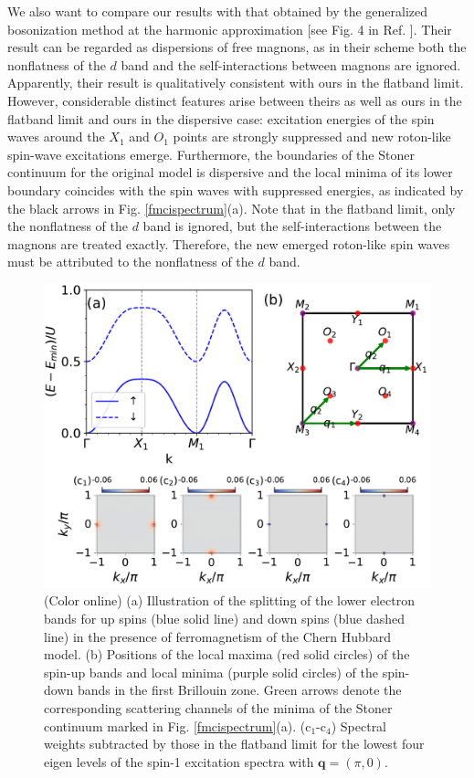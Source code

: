 \documentclass[amsmath,superscriptaddress,showpacs,aps,prb,twocolumn]{revtex4-1}
\begin{document}
\par We also want to compare our results with that obtained by the generalized bosonization method at the harmonic approximation [see Fig. 4 in Ref. \cite{DG_PRB2015}]. Their result can be regarded as dispersions of free magnons, as in their scheme both the nonflatness of the $d$ band and the self-interactions between magnons are ignored. Apparently, their result is qualitatively consistent with ours in the flatband limit. However, considerable distinct features arise between theirs as well as ours in the flatband limit and ours in the dispersive case: excitation energies of the spin waves around the $X_1$ and $O_1$ points are strongly suppressed and new roton-like spin-wave excitations emerge. Furthermore, the boundaries of the Stoner continuum for the original model is dispersive and the local minima of its lower boundary coincides with the spin waves with suppressed energies, as indicated by the black arrows in Fig. \ref{fmcispectrum}(a). Note that in the flatband limit, only the nonflatness of the $d$ band is ignored, but the self-interactions between the magnons are treated exactly. Therefore, the new emerged roton-like spin waves must be attributed to the nonflatness of the $d$ band.

\begin{figure}
\includegraphics[width=\columnwidth]{bspicture}
\caption{(Color online) (a) Illustration of the splitting of the lower electron bands for up spins (blue solid line) and down spins (blue dashed line) in the presence of ferromagnetism of the Chern Hubbard model. (b) Positions of the local maxima (red solid circles) of the spin-up bands and local minima (purple solid circles) of the spin-down bands in the first Brillouin zone. Green arrows denote the corresponding scattering channels of the minima of the Stoner continuum marked in Fig. \ref{fmcispectrum}(a). (c$_1$-c$_4$) Spectral weights subtracted by those in the flatband limit for the lowest four eigen levels of the spin-1 excitation spectra with $\mathbf{q}=(\pi,0)$.}
\label{bspicture}
\end{figure}
\end{document}
